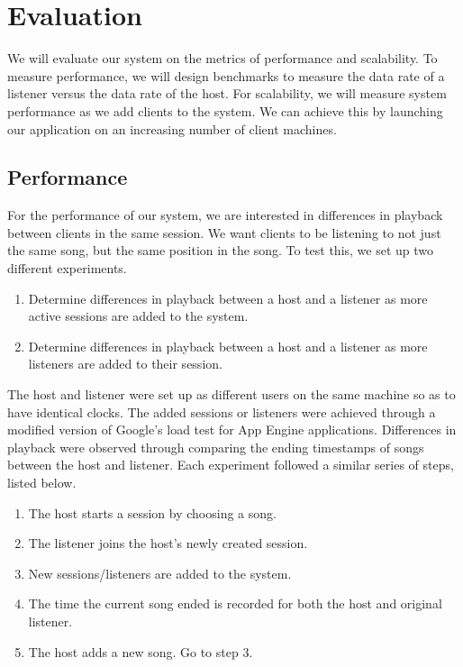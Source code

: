 \section{Evaluation}
\label{sec:eval}
We will evaluate our system on the metrics of performance
and scalability. To measure performance, 
we will design benchmarks to measure the data rate 
of a listener versus the data rate of the host.
For scalability, we will measure system 
performance as we add clients to the system. We can 
achieve this by launching our application on an 
increasing number of client machines.

\subsection{Performance}

For the performance of our system, we are interested in
differences in playback between clients in the same session.
We want clients to be listening to not just the same song,
but the same position in the song. To test this, we set up two
different experiments.

\begin{enumerate}

\item Determine differences in playback between a host and a
listener as more active sessions are added to the system.

\item Determine differences in playback between a host and a
listener as more listeners are added to their session.

\end{enumerate}

The host and listener were set up as different users on the same machine
so as to have identical clocks. The added sessions or listeners
were achieved through a modified version of Google's load test
for App Engine applications. Differences in playback were observed
through comparing the ending timestamps of songs between the host
and listener. Each experiment followed a similar series of steps,
listed below.

\begin{enumerate}

\item The host starts a session by choosing a song.

\item The listener joins the host's newly created session.

\item New sessions/listeners are added to the system.

\item The time the current song ended is recorded for both the
host and original listener.

\item The host adds a new song. Go to step 3.

\end{enumerate}

